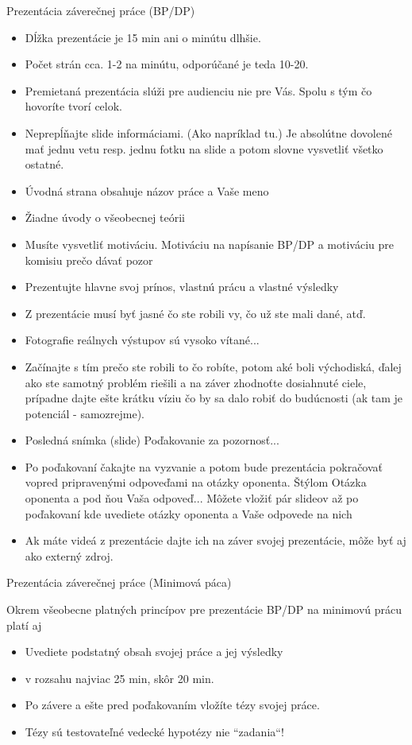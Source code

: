 \documentclass{beamer}                              %
\begin{document}
\begin{frame}[allowframebreaks]{Prezentácia záverečnej práce (BP/DP)}
\begin{itemize}
  \item Dĺžka prezentácie je 15 min ani o minútu dlhšie.
  \item Počet strán cca. 1-2 na minútu, odporúčané je teda 10-20.
  \item Premietaná prezentácia slúži pre audienciu nie pre Vás. Spolu s tým čo hovoríte tvorí celok.
  \item Neprepĺňajte slide informáciami. (Ako napríklad tu.) Je absolútne dovolené mať jednu vetu resp. jednu fotku na slide a potom slovne vysvetliť všetko ostatné.
 \item Úvodná strana obsahuje názov práce a Vaše meno
 \item Žiadne úvody o všeobecnej teórii
 \item Musíte vysvetliť motiváciu. Motiváciu na napísanie BP/DP a motiváciu pre komisiu prečo dávať pozor
  \item Prezentujte hlavne svoj prínos, vlastnú prácu a vlastné výsledky
  \item Z prezentácie musí byť jasné čo ste robili vy, čo už ste mali dané, atď.
  \item Fotografie reálnych výstupov sú vysoko vítané...
  \item Začínajte s tím prečo ste robili to čo robíte, potom aké boli východiská, ďalej ako ste samotný problém riešili a na záver zhodnoťte dosiahnuté ciele, prípadne dajte ešte krátku víziu čo by sa dalo robiť do budúcnosti (ak tam je potenciál - samozrejme).
  \item Posledná snímka (slide) Poďakovanie za pozornosť...
 \item Po poďakovaní čakajte na vyzvanie a potom bude prezentácia pokračovať vopred pripravenými odpoveďami na otázky oponenta. Štýlom Otázka oponenta a pod ňou Vaša odpoveď... Môžete vložiť pár slideov až po poďakovaní kde uvediete otázky oponenta a Vaše odpovede na nich
 \item Ak máte videá z prezentácie dajte ich na záver svojej prezentácie, môže byť aj ako externý zdroj.

\end{itemize}
\end{frame}


\begin{frame}{Prezentácia záverečnej práce (Minimová páca)}

Okrem všeobecne platných princípov pre prezentácie BP/DP na minimovú prácu platí aj

\begin{itemize}
 \item Uvediete podstatný obsah svojej práce a jej výsledky
 \item v rozsahu najviac 25 min, skôr 20 min.
 \item Po závere a ešte pred poďakovaním vložíte tézy svojej práce.
 \item Tézy sú testovateľné vedecké hypotézy nie ``zadania``!
\end{itemize}
\end{frame}
\end{document}
